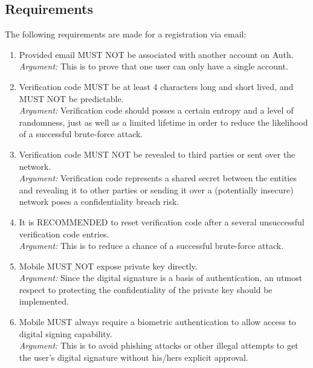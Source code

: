     \subsection{Requirements}
    The following requirements are made for a registration via email:
        \begin{enumerate}
            \item Provided email MUST NOT be associated with another account on Auth.\\
            \textit{Argument:} This is to prove that one user can only have a single account.

            \item Verification code MUST be at least 4 characters long and short lived, and MUST NOT be 
                predictable.\\        
            \textit{Argument:} Verification code should posses a certain entropy and a level of randomness, 
                            just as well as a limited lifetime in order to reduce the likelihood of a 
                            successful brute-force attack.

            \item Verification code MUST NOT be revealed to third parties or sent over the network.\\        
            \textit{Argument:} Verification code represents a shared secret between the entities and revealing 
                            it to other parties or sending it over a (potentially insecure) network poses 
                            a confidentiality breach risk. 

            \item It is RECOMMENDED to reset verification code after a several unsuccessful verification 
                code entries.\\        
            \textit{Argument:} This is to reduce a chance of a successful brute-force attack.

            \item Mobile MUST NOT expose private key directly.\\
            \textit{Argument:} Since the digital signature is a basis of authentication, an utmost respect to 
                            protecting the confidentiality of the private key should be implemented.

            \item Mobile MUST always require a biometric authentication to allow access to digital signing 
                capability.\\        
            \textit{Argument:} This is to avoid phishing attacks or other illegal attempts to get the user's 
                            digital signature without his/hers explicit approval.


\end{enumerate}
